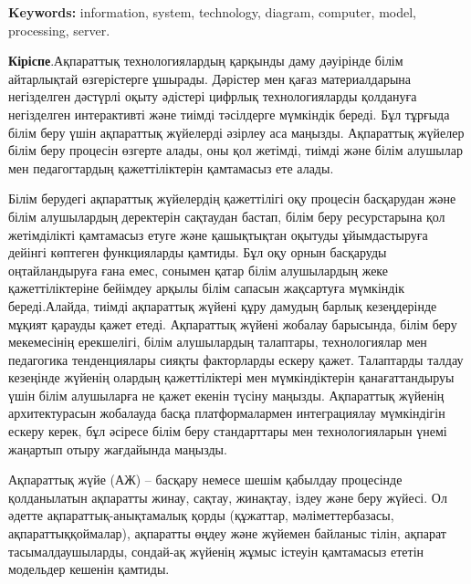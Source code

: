 {\bfseries Keywords:} information, system, technology, diagram, computer,
model, processing, server.

\begin{multicols}{2}
{\bfseries Кіріспе}.Ақпараттық технологиялардың қарқынды даму дәуірінде
білім айтарлықтай өзгерістерге ұшырады. Дәрістер мен қағаз
материалдарына негізделген дәстүрлі оқыту әдістері цифрлық
технологияларды қолдануға негізделген интерактивті және тиімді
тәсілдерге мүмкіндік береді. Бұл тұрғыда білім беру үшін ақпараттық
жүйелерді әзірлеу аса маңызды. Ақпараттық жүйелер білім беру процесін
өзгерте алады, оны қол жетімді, тиімді және білім алушылар мен
педагогтардың қажеттіліктерін қамтамасыз ете алады.

Білім берудегі ақпараттық жүйелердің қажеттілігі оқу процесін басқарудан
және білім алушылардың деректерін сақтаудан бастап, білім беру
ресурстарына қол жетімділікті қамтамасыз етуге және қашықтықтан оқытуды
ұйымдастыруға дейінгі көптеген функцияларды қамтиды. Бұл оқу орнын
басқаруды оңтайландыруға ғана емес, сонымен қатар білім алушылардың жеке
қажеттіліктеріне бейімдеу арқылы білім сапасын жақсартуға мүмкіндік
береді.Алайда, тиімді ақпараттық жүйені құру дамудың барлық кезеңдерінде
мұқият қарауды қажет етеді. Ақпараттық жүйені жобалау барысында, білім
беру мекемесінің ерекшелігі, білім алушылардың талаптары, технологиялар
мен педагогика тенденциялары сияқты факторларды ескеру қажет. Талаптарды
талдау кезеңінде жүйенің олардың қажеттіліктері мен мүмкіндіктерін
қанағаттандыруы үшін білім алушыларға не қажет екенін түсіну маңызды.
Ақпараттық жүйенің архитектурасын жобалауда басқа платформалармен
интеграциялау мүмкіндігін ескеру керек, бұл әсіресе білім беру
стандарттары мен технологияларын үнемі жаңартып отыру жағдайында
маңызды.

Ақпараттық жүйе (АЖ) -- басқару немесе шешім қабылдау процесінде
қолданылатын ақпаратты жинау, сақтау, жинақтау, іздеу және беру жүйесі.
Ол әдетте ақпараттық-анықтамалық қорды (құжаттар, мәліметтербазасы,
ақпараттыққоймалар), ақпаратты өңдеу және жүйемен байланыс тілін,
ақпарат тасымалдаушыларды, сондай-ақ жүйенің жұмыс істеуін қамтамасыз
ететін модельдер кешенін қамтиды.


\end{multicols}
